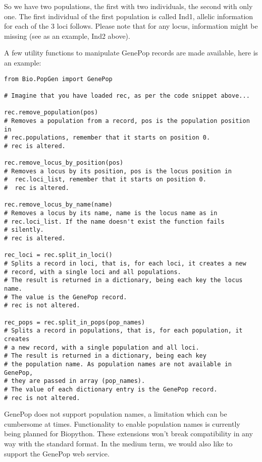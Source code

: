 So we have two populations, the first with two individuals, the
second with only one. The first individual of the first
population is called Ind1, allelic information for each of
the 3 loci follows. Please note that for any locus, information
might be missing (see as an example, Ind2 above).

A few utility functions to manipulate GenePop records are made
available, here is an example:

\begin{verbatim}
from Bio.PopGen import GenePop

# Imagine that you have loaded rec, as per the code snippet above...

rec.remove_population(pos)
# Removes a population from a record, pos is the population position in
# rec.populations, remember that it starts on position 0.
# rec is altered.

rec.remove_locus_by_position(pos)
# Removes a locus by its position, pos is the locus position in
#  rec.loci_list, remember that it starts on position 0.
#  rec is altered.

rec.remove_locus_by_name(name)
# Removes a locus by its name, name is the locus name as in
# rec.loci_list. If the name doesn't exist the function fails
# silently.
# rec is altered.

rec_loci = rec.split_in_loci()
# Splits a record in loci, that is, for each loci, it creates a new
# record, with a single loci and all populations.
# The result is returned in a dictionary, being each key the locus name.
# The value is the GenePop record.
# rec is not altered.

rec_pops = rec.split_in_pops(pop_names)
# Splits a record in populations, that is, for each population, it creates
# a new record, with a single population and all loci.
# The result is returned in a dictionary, being each key
# the population name. As population names are not available in GenePop,
# they are passed in array (pop_names).
# The value of each dictionary entry is the GenePop record.
# rec is not altered.
\end{verbatim}

GenePop does not support population names, a limitation which can be
cumbersome at times. Functionality to enable population names is currently
being planned for Biopython. These extensions won't break compatibility in
any way with the standard format.  In the medium term, we would also like to
support the GenePop web service.
